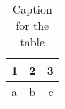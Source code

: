 \documentclass{article}
\begin{document}
\begin{table}[h!]
\centering
\caption{Caption for the table}
\label{tab:table1}
\begin{tabular}{l|c||r}
1 & 2 & 3\\
\hline
a & b & c\\
\end{tabular}
\end{table}	
\end{document}
